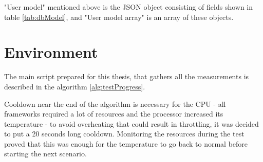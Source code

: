 "User model" mentioned above is the JSON object consisting of fields shown in table \ref{tab:dbModel}, and "User model array" is an array of these objects.

\section{Environment}

The main script prepared for this thesis, that gathers all the measurements is described in the algorithm \ref{alg:testProgress}.



Cooldown near the end of the algorithm is necessary for the CPU - all frameworks required a lot of resources and the processor increased its temperature - to avoid overheating that could result in throttling, it was decided to put a 20 seconds long cooldown. Monitoring the resources during the test proved that this was enough for the temperature to go back to normal before starting the next scenario.

